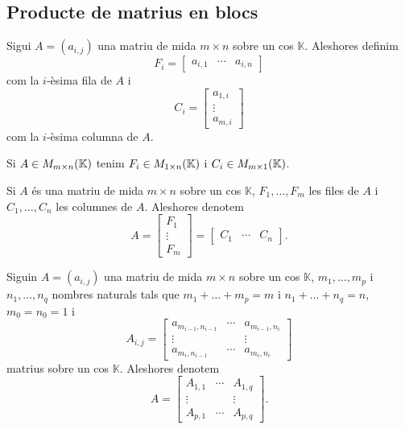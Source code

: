 \documentclass[../../Main.tex]{subfiles}
\begin{document}
	\subsection{Producte de matrius en blocs}%
	\begin{definition}
		\label{def:fila d'una matriu}
		\label{def:columna d'una matriu}
		Sigui \(A=(a_{i,j})\) una matriu de mida \(m\times n\) sobre un cos \(\mathbb{K}\). Aleshores definim
		\[F_{i}=\left[\begin{matrix}
		a_{i,1} & \cdots & a_{i,n}
		\end{matrix}\right]\]
		com la \(i\)-èsima fila de \(A\) i
		\[C_{i}=\left[\begin{matrix}
		a_{1,i} \\
		\vdots \\
		a_{m,i}
		\end{matrix}\right]\]
		com la \(i\)-èsima columna de \(A\).
	\end{definition}
	\begin{observation}
		\label{obs:on pertanyen les files i les columnes d'una matriu}
		Si \(A\in M_{m\times n}(\mathbb{K})\) tenim \(F_{i}\in M_{1\times n}(\mathbb{K})\) i \(C_{i}\in M_{m\times 1}(\mathbb{K})\).
	\end{observation}
	\begin{notation}
		Si \(A\) és una matriu de mida \(m\times n\) sobre un cos \(\mathbb{K}\), \(F_{1},\dots,F_{m}\) les files de \(A\) i \(C_{1},\dots,C_{n}\) les columnes de \(A\). Aleshores denotem
		\[A=\left[\begin{matrix}
		F_{1} \\
		\vdots \\
		F_{m}
		\end{matrix}\right]=\left[\begin{matrix}
		C_{1} & \cdots & C_{n}
		\end{matrix}\right].\]
	\end{notation}
	\begin{notation}
		Siguin \(A=(a_{i,j})\) una matriu de mida \(m\times n\) sobre un cos \(\mathbb{K}\), \(m_{1},\dots,m_{p}\) i \(n_{1},\dots,n_{q}\) nombres naturals tals que \(m_{1}+\dots+m_{p}=m\) i \(n_{1}+\dots+n_{q}=n\), \(m_{0}=n_{0}=1\) i
		\[A_{i,j}=\left[\begin{matrix}
		a_{m_{i-1},n_{i-1}} & \cdots & a_{m_{i-1},n_{i}}\\
		\vdots & & \vdots \\
		a_{m_{i},n_{i-1}} & \cdots & a_{m_{i},n_{i}}
		\end{matrix}\right]\]
		matrius sobre un cos \(\mathbb{K}\). Aleshores denotem
		\[A=\left[\begin{matrix}
		A_{1,1} & \cdots & A_{1,q} \\
		\vdots & & \vdots \\
		A_{p,1} & \cdots & A_{p,q}
		\end{matrix}\right].\]
	\end{notation}
\end{document}
